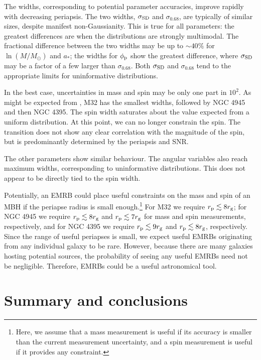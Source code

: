 The widths, corresponding to potential parameter accuracies, improve rapidly with decreasing periapsis. The two widths, $\sigma_\mathrm{SD}$ and $\sigma_{0.68}$, are typically of similar sizes, despite manifest non-Gaussianity. This is true for all parameters: the greatest differences are when the distributions are strongly multimodal. The fractional difference between the two widths may be up to $\sim 40\%$ for $\ln(M/M_\odot)$ and $a_\ast$; the widths for $\phi_\mathrm{p}$ show the greatest difference, where $\sigma_\mathrm{SD}$ may be a factor of a few larger than $\sigma_{0.68}$. Both $\sigma_\mathrm{SD}$ and $\sigma_{0.68}$ tend to the appropriate limits for uninformative distributions.

In the best case, uncertainties in mass and spin may be only one part in $10^2$. As might be expected from , M32 has the smallest widths, followed by NGC 4945 and then NGC 4395. The spin width saturates about the value expected from a uniform distribution. At this point, we can no longer constrain the spin. The transition does not show any clear correlation with the magnitude of the spin, but is predominantly determined by the periapsis and SNR.

The other parameters show similar behaviour. The angular variables also reach maximum widths, corresponding to uninformative distributions. This does not appear to be directly tied to the spin width.

Potentially, an EMRB could place useful constraints on the mass and spin of an MBH if the periapse radius is small enough.\footnote{Here, we assume that a mass measurement is useful if its accuracy is smaller than the current measurement uncertainty, and a spin measurement is useful if it provides any constraint.} For M32 we require $r_\mathrm{p} \lesssim 8 r_\mathrm{g}$; for NGC 4945 we require $r_\mathrm{p} \lesssim 8 r_\mathrm{g}$ and $r_\mathrm{p} \lesssim 7 r_\mathrm{g}$ for mass and spin measurements, respectively, and for NGC 4395 we require $r_\mathrm{p} \lesssim 9 r_\mathrm{g}$ and $r_\mathrm{p} \lesssim 8 r_\mathrm{g}$, respectively. Since the range of useful periapses is small, we expect useful EMRBs originating from any individual galaxy to be rare. However, because there are many galaxies hosting potential sources, the probability of seeing any useful EMRBs need not be negligible. Therefore, EMRBs could be a useful astronomical tool.

\section{Summary and conclusions}\label{sec:extragal-End}

